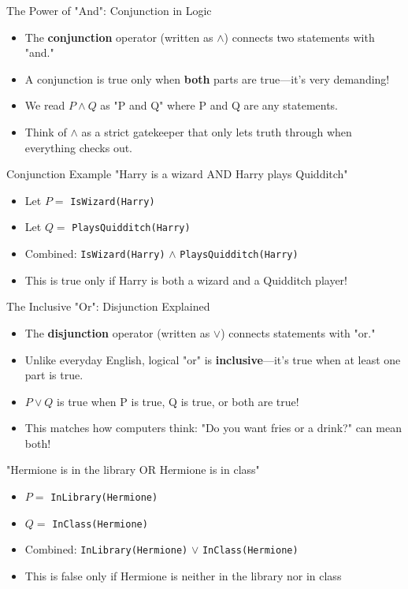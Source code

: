 \documentclass{beamer}
\begin{document}
	\begin{frame}{The Power of "And": Conjunction in Logic}
		\begin{itemize}
			\item The \textbf{conjunction} operator (written as $\land$) connects two statements with "and."
			\item A conjunction is true only when \textbf{both} parts are true—it's very demanding!
			\item We read $P \land Q$ as "P and Q" where P and Q are any statements.
			\item Think of $\land$ as a strict gatekeeper that only lets truth through when everything checks out.
		\end{itemize}
		
		\begin{block}{Conjunction Example}
			"Harry is a wizard AND Harry plays Quidditch"
			\begin{itemize}
				\item Let $P = $ \texttt{IsWizard(Harry)}
				\item Let $Q = $ \texttt{PlaysQuidditch(Harry)}  
				\item Combined: \texttt{IsWizard(Harry)} $\land$ \texttt{PlaysQuidditch(Harry)}
				\item This is true only if Harry is both a wizard and a Quidditch player!
			\end{itemize}
		\end{block}
	\end{frame}
	
	\begin{frame}{The Inclusive "Or": Disjunction Explained}
		\begin{itemize}
			\item The \textbf{disjunction} operator (written as $\lor$) connects statements with "or."
			\item Unlike everyday English, logical "or" is \textbf{inclusive}—it's true when at least one part is true.
			\item $P \lor Q$ is true when P is true, Q is true, or both are true!
			\item This matches how computers think: "Do you want fries or a drink?" can mean both!
		\end{itemize}
		
		\begin{example}
			"Hermione is in the library OR Hermione is in class"
			\begin{itemize}
				\item $P = $ \texttt{InLibrary(Hermione)}
				\item $Q = $ \texttt{InClass(Hermione)}
				\item Combined: \texttt{InLibrary(Hermione)} $\lor$ \texttt{InClass(Hermione)}
				\item This is false only if Hermione is neither in the library nor in class
			\end{itemize}
		\end{example}
	\end{frame}
	
\end{document}
